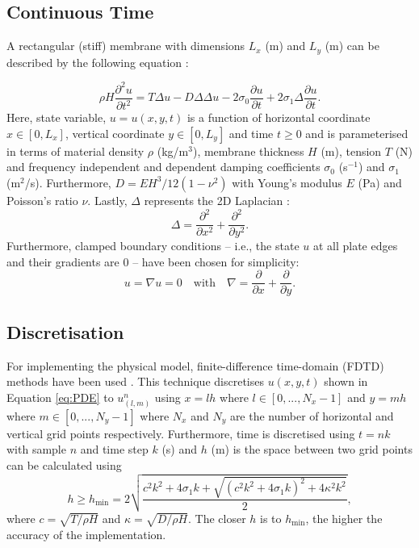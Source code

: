 \documentclass{article}
\begin{document}
\subsection{Continuous Time}
A rectangular (stiff) membrane with dimensions $L_x$ (m) and $L_y$ (m) can be described by the following equation \cite{bilbao2009numerical}:

\begin{equation}\label{eq:PDE}
\rho H\frac{\partial^2u}{\partial t^2} = T\Delta u - D\Delta\Delta u - 2 \sigma_0\frac{\partial u}{\partial t} + 2 \sigma_1 \Delta \frac{\partial u}{\partial t}.
\end{equation}
Here, state variable, $u = u(x,y,t)$ is a function of horizontal coordinate $x \in [0, L_x]$, vertical coordinate $y \in [0, L_y]$ and time $t\geq0$ and is parameterised in terms of material density $\rho$ (kg/m$^3$), membrane thickness $H$ (m), tension $T$ (N) and frequency independent and dependent damping coefficients $\sigma_0$ (s$^{-1}$) and $\sigma_1$ (m$^2$/s). Furthermore, $D = EH^3/12(1-\nu^2)$ with Young's modulus $E$ (Pa) and Poisson's ratio $\nu$. Lastly, $\Delta$ represents the 2D Laplacian \cite{bilbao2009numerical}:
\begin{equation}
    \Delta = \frac{\partial^2}{\partial x^2} + \frac{\partial^2}{\partial y^2}.
\end{equation}
Furthermore, clamped boundary conditions -- i.e., the state $u$ at all plate edges and their gradients are 0 -- have been chosen for simplicity:
\begin{equation}
    u = \nabla u = 0 \quad \text{with} \quad \nabla = \frac{\partial}{\partial x} + \frac{\partial}{\partial y}.
\end{equation}
\subsection{Discretisation}
For implementing the physical model, finite-difference time-domain (FDTD) methods have been used \cite{bilbao2009numerical}. This technique discretises $u(x,y,t)$ shown in Equation \eqref{eq:PDE} to $u_{(l,m)}^n$ using $x=lh$ where $l \in [0, ..., N_x-1]$ and $y=mh$ where $m \in [0, ..., N_y-1]$ where $N_x$ and $N_y$ are the number of horizontal and vertical grid points respectively. Furthermore, time is discretised using $t = nk$ with sample $n$ and time step $k$ (s) and $h$ (m) is the space between two grid points can be calculated using 
\begin{equation}\label{eq:h}
    h \geq h_\text{min} =  2\sqrt{\frac{c^2k^2 + 4\sigma_1k + \sqrt{(c^2k^2 + 4\sigma_1k)^2 + 4\kappa^2 k^2} }{2}},
\end{equation}
where $c = \sqrt{T/\rho H}$ and $\kappa = \sqrt{D/\rho H}$. The closer $h$ is to $h_\text{min}$, the higher the accuracy of the implementation.
\end{document}
